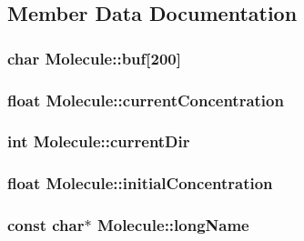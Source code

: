 \subsection{Member Data Documentation}
\hypertarget{classMolecule_a5b6f24dea7138830541e938e2eed707a}{
\subsubsection[{buf}]{\setlength{\rightskip}{0pt plus 5cm}char {\bf Molecule::buf}\mbox{[}200\mbox{]}}}
\label{classMolecule_a5b6f24dea7138830541e938e2eed707a}
\hypertarget{classMolecule_a2c7587932c7eae82adedfd1022eefea9}{
\subsubsection[{currentConcentration}]{\setlength{\rightskip}{0pt plus 5cm}float {\bf Molecule::currentConcentration}}}
\label{classMolecule_a2c7587932c7eae82adedfd1022eefea9}
\hypertarget{classMolecule_a4cd5591c0a8c07ceec922c4f2e8f295c}{
\subsubsection[{currentDir}]{\setlength{\rightskip}{0pt plus 5cm}int {\bf Molecule::currentDir}}}
\label{classMolecule_a4cd5591c0a8c07ceec922c4f2e8f295c}
\hypertarget{classMolecule_ac3b04a11e12391be3fdac1251f0a62d0}{
\subsubsection[{initialConcentration}]{\setlength{\rightskip}{0pt plus 5cm}float {\bf Molecule::initialConcentration}}}
\label{classMolecule_ac3b04a11e12391be3fdac1251f0a62d0}
\hypertarget{classMolecule_a4ac09eefeba07dcb455014acc1ad00c9}{
\subsubsection[{longName}]{\setlength{\rightskip}{0pt plus 5cm}const char$\ast$ {\bf Molecule::longName}}}
